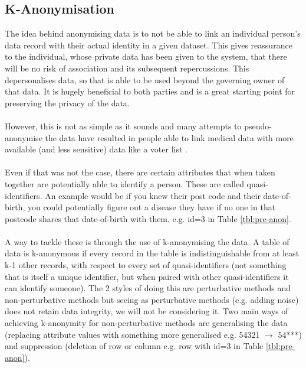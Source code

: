 \subsection{K-Anonymisation}
The idea behind anonymising data is to not be able to link an individual person's data record with their actual identity in a given dataset. This gives reassurance to the individual, whose private data has been given to the system, that there will be no risk of association and its subsequent repercussions. This depersonalises data, so that is able to be used beyond the governing owner of that data. 
It is hugely beneficial to both parties and is a great starting point for preserving the privacy of the data. 
\\ \\
However, this is not as simple as it sounds and many attempts to pseudo-anonymise the data have resulted in people able to link medical data with more available (and less sensitive) data like a voter list \cite{failed_anonymisation}.
\\ \\
Even if that was not the case, there are certain attributes that when taken together are potentially able to identify a person. These are called quasi-identifiers. 
An example would be if you knew their post code and their date-of-birth, you could potentially figure out a disease they have if no one in that postcode shares that date-of-birth with them. e.g. id=3 in Table \ref{tbl:pre-anon}.
\\ \\
A way to tackle these is through the use of k-anonymising the data. A table of data is k-anonymous if every record in the table is indistinguishable from at least k-1 other records, with respect to every set of quasi-identifiers (not something that is itself a unique identifier, but when paired with other quasi-identifiers it can identify someone). 
The 2 styles of doing this are perturbative methods and non-perturbative methods but seeing as perturbative methods (e.g. adding noise) does not retain data integrity, we will not be considering it. 
Two main ways of achieving k-anonymity for non-perturbative methods are generalising the data (replacing attribute values with something more generalised e.g. 54321 $\longrightarrow$ 54***) and suppression (deletion of row or column e.g. row with id=3 in Table \ref{tbl:pre-anon}).
